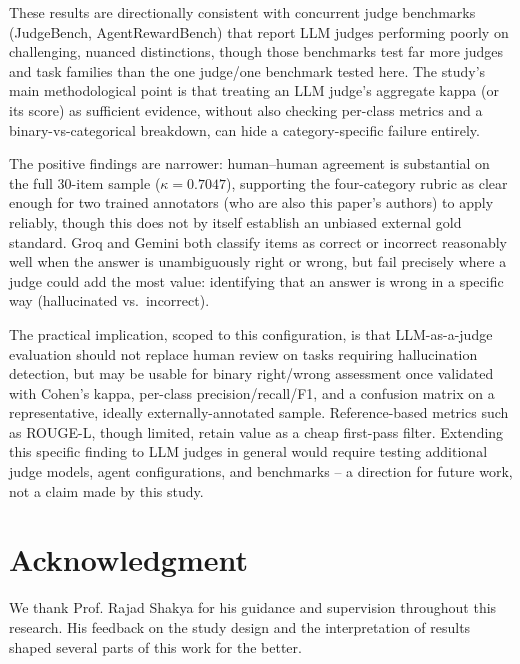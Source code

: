 \documentclass[conference]{IEEEtran}
\begin{document}
These results are directionally consistent with concurrent judge benchmarks (JudgeBench, AgentRewardBench) that report LLM judges performing poorly on challenging, nuanced distinctions, though those benchmarks test far more judges and task families than the one judge/one benchmark tested here. The study's main methodological point is that treating an LLM judge's aggregate kappa (or its score) as sufficient evidence, without also checking per-class metrics and a binary-vs-categorical breakdown, can hide a category-specific failure entirely.

The positive findings are narrower: human--human agreement is substantial on the full 30-item sample ($\kappa=0.7047$), supporting the four-category rubric as clear enough for two trained annotators (who are also this paper's authors) to apply reliably, though this does not by itself establish an unbiased external gold standard. Groq and Gemini both classify items as correct or incorrect reasonably well when the answer is unambiguously right or wrong, but fail precisely where a judge could add the most value: identifying that an answer is wrong in a specific way (hallucinated vs.\ incorrect).

The practical implication, scoped to this configuration, is that LLM-as-a-judge evaluation should not replace human review on tasks requiring hallucination detection, but may be usable for binary right/wrong assessment once validated with Cohen's kappa, per-class precision/recall/F1, and a confusion matrix on a representative, ideally externally-annotated sample. Reference-based metrics such as ROUGE-L, though limited, retain value as a cheap first-pass filter. Extending this specific finding to LLM judges in general would require testing additional judge models, agent configurations, and benchmarks -- a direction for future work, not a claim made by this study.

\section*{Acknowledgment}
We thank Prof. Rajad Shakya for his guidance and supervision throughout this research. His feedback on the study design and the interpretation of results shaped several parts of this work for the better.
\end{document}
